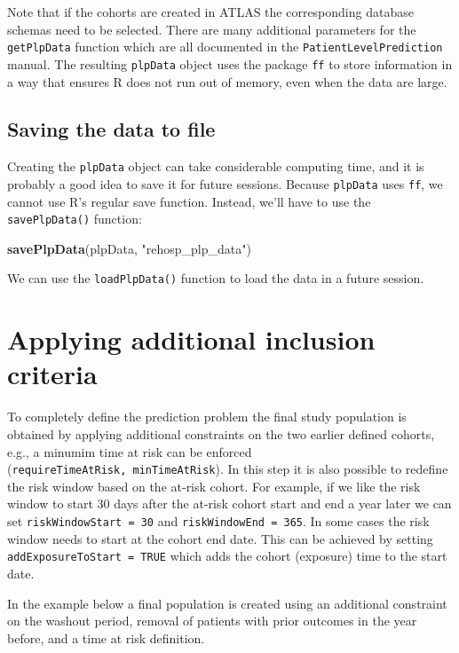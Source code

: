 \documentclass[]{article}
\newenvironment{Shaded}{\begin{snugshade}}{\end{snugshade}}
\newcommand{\KeywordTok}[1]{\textcolor[rgb]{0.13,0.29,0.53}{\textbf{#1}}}
\newcommand{\StringTok}[1]{\textcolor[rgb]{0.31,0.60,0.02}{#1}}
\newcommand{\NormalTok}[1]{#1}
\begin{document}
Note that if the cohorts are created in ATLAS the corresponding database
schemas need to be selected. There are many additional parameters for
the \texttt{getPlpData} function which are all documented in the
\texttt{PatientLevelPrediction} manual. The resulting \texttt{plpData}
object uses the package \texttt{ff} to store information in a way that
ensures R does not run out of memory, even when the data are large.

\subsection{Saving the data to file}\label{saving-the-data-to-file}

Creating the \texttt{plpData} object can take considerable computing
time, and it is probably a good idea to save it for future sessions.
Because \texttt{plpData} uses \texttt{ff}, we cannot use R's regular
save function. Instead, we'll have to use the \texttt{savePlpData()}
function:

\begin{Shaded}
\begin{Highlighting}[]
\KeywordTok{savePlpData}\NormalTok{(plpData, }\StringTok{"rehosp_plp_data"}\NormalTok{)}
\end{Highlighting}
\end{Shaded}

We can use the \texttt{loadPlpData()} function to load the data in a
future session.

\section{Applying additional inclusion
criteria}\label{applying-additional-inclusion-criteria}

To completely define the prediction problem the final study population
is obtained by applying additional constraints on the two earlier
defined cohorts, e.g., a minumim time at risk can be enforced
(\texttt{requireTimeAtRisk,\ minTimeAtRisk}). In this step it is also
possible to redefine the risk window based on the at-risk cohort. For
example, if we like the risk window to start 30 days after the at-risk
cohort start and end a year later we can set
\texttt{riskWindowStart\ =\ 30} and \texttt{riskWindowEnd\ =\ 365}. In
some cases the risk window needs to start at the cohort end date. This
can be achieved by setting \texttt{addExposureToStart\ =\ TRUE} which
adds the cohort (exposure) time to the start date.

In the example below a final population is created using an additional
constraint on the washout period, removal of patients with prior
outcomes in the year before, and a time at risk definition.
\end{document}

